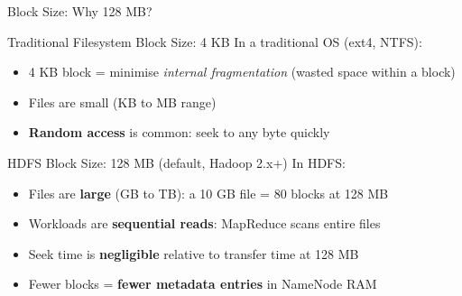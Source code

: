 \documentclass[aspectratio=169,10pt]{beamer}
\begin{document}
\begin{frame}{Block Size: Why 128 MB?}
 
      \begin{block}{Traditional Filesystem Block Size: 4 KB}
        In a traditional OS (ext4, NTFS):
        \begin{itemize}
          \item 4 KB block = minimise \emph{internal fragmentation} (wasted space within a block)
          \item Files are small (KB to MB range)
          \item \textbf{Random access} is common: seek to any byte quickly
        \end{itemize}
      \end{block}
      \vspace{6pt}
      \begin{exampleblock}{HDFS Block Size: 128 MB (default, Hadoop 2.x+)}
        In HDFS:
        \begin{itemize}
          \item Files are \textbf{large} (GB to TB): a 10 GB file = 80 blocks at 128 MB
          \item Workloads are \textbf{sequential reads}: MapReduce scans entire files
          \item Seek time is \textbf{negligible} relative to transfer time at 128 MB
          \item Fewer blocks = \textbf{fewer metadata entries} in NameNode RAM
        \end{itemize}
      \end{exampleblock}

     
\end{frame}
\end{document}
